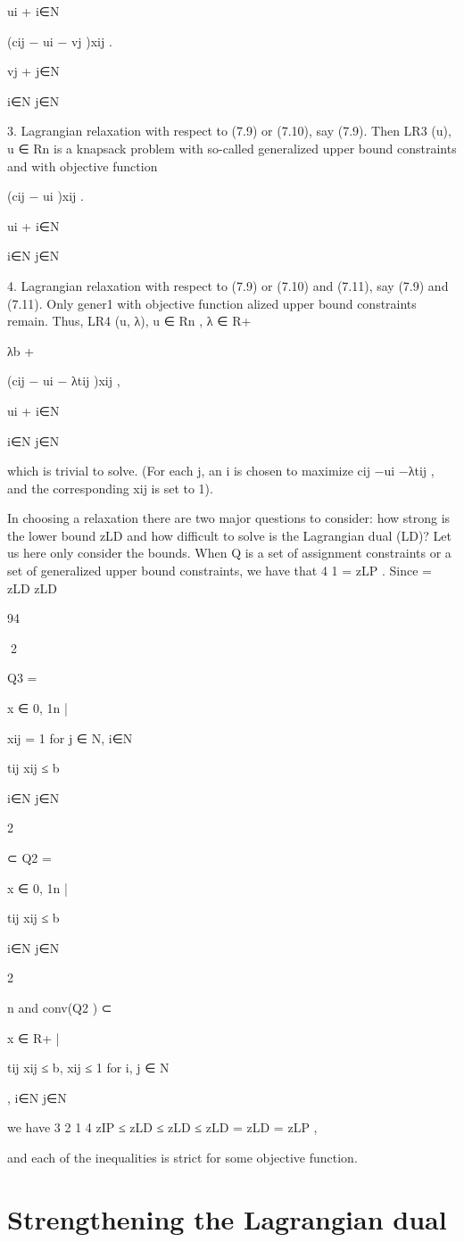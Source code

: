 ui +
i∈N

(cij − ui − vj )xij .

vj +
j∈N

i∈N j∈N

3. Lagrangian relaxation with respect to (7.9) or (7.10), say (7.9). Then LR3 (u), u ∈ Rn is a knapsack
problem with so-called generalized upper bound constraints and with objective function

(cij − ui )xij .

ui +
i∈N

i∈N j∈N

4. Lagrangian relaxation with respect to (7.9) or (7.10) and (7.11), say (7.9) and (7.11). Only gener1
with objective function
alized upper bound constraints remain. Thus, LR4 (u, λ), u ∈ Rn , λ ∈ R+

λb +

(cij − ui − λtij )xij ,

ui +
i∈N

i∈N j∈N

which is trivial to solve. (For each j, an i is chosen to maximize cij −ui −λtij , and the corresponding
xij is set to 1).

In choosing a relaxation there are two major questions to consider: how strong is the lower bound zLD
and how difficult to solve is the Lagrangian dual (LD)? Let us here only consider the bounds.
When Q is a set of assignment constraints or a set of generalized upper bound constraints, we have that
4
1
= zLP . Since
= zLD
zLD

94

2

Q3 = {x ∈ {0, 1}n |

xij = 1 for j ∈ N,
i∈N

tij xij ≤ b}
i∈N j∈N

2

⊂ Q2 = {x ∈ {0, 1}n |

tij xij ≤ b}
i∈N j∈N

2

n
and conv(Q2 ) ⊂ {x ∈ R+
|

tij xij ≤ b, xij ≤ 1 for i, j ∈ N },
i∈N j∈N

we have
3
2
1
4
zIP ≤ zLD
≤ zLD
≤ zLD
= zLD
= zLP ,

and each of the inequalities is strict for some objective function.

\section{Strengthening the Lagrangian dual}

